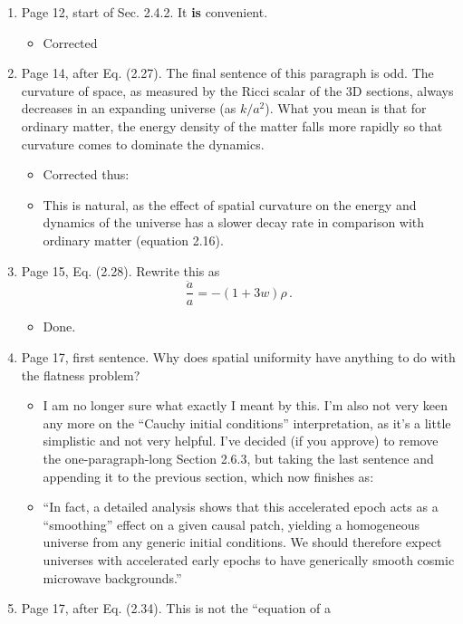 \documentclass[11pt]{article}
\begin{document}
\begin{enumerate}
\item Page 12, start of Sec. 2.4.2. It \textbf{is} convenient.
  \begin{itemize}
    \item Corrected
  \end{itemize}
\item Page 14, after Eq. (2.27). The final sentence of this paragraph
  is odd. The curvature of space, as measured by the Ricci scalar of
  the 3D sections, always decreases in an expanding universe (as
  $k/a^2$). What you mean is that for ordinary matter, the energy
  density of the matter falls more rapidly so that curvature comes to
  dominate the dynamics.
  \begin{itemize}
    \item Corrected thus:
    \item This is natural, as the effect of spatial curvature on the energy and dynamics of the universe has a slower decay rate in comparison with ordinary matter (equation 2.16).
  \end{itemize}
\item Page 15, Eq. (2.28). Rewrite this as 
%
\begin{equation}
\frac{\ddot{a}}{a} = - (1+3w) \rho \, . \tag{2.28}
\end{equation}
%
\begin{itemize}
  \item Done.
\end{itemize}
\item Page 17, first sentence. Why does spatial uniformity have
  anything to do with the flatness problem?
\begin{itemize}
    \item I am no longer sure what exactly I meant by this. I'm also not very keen any more on the ``Cauchy initial conditions'' interpretation, as it's a little simplistic and not very helpful. I've decided (if you approve) to remove the one-paragraph-long Section 2.6.3, but taking the last sentence and appending it to the previous section, which now finishes as:
    \item ``In fact, a detailed analysis shows that this accelerated epoch acts as a ``smoothing'' effect on a given causal patch, yielding a homogeneous universe from any generic initial conditions. We should therefore expect universes with accelerated early epochs to have generically smooth cosmic microwave backgrounds.''
\end{itemize}
\item Page 17, after Eq. (2.34). This is not the ``equation of a

\end{enumerate}
\end{document}
